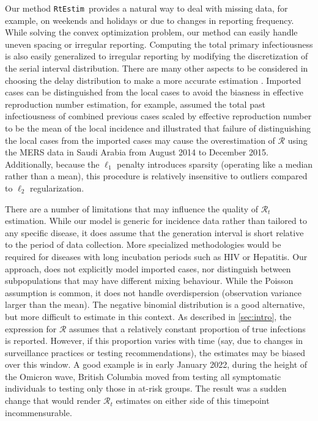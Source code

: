 \documentclass[10pt,letterpaper]{article}
\def\RtEstim{\texttt{RtEstim}}
\def\calR{\mathcal{R}}
\newcommand{\citep}[1]{\cite{#1}}
\begin{document}
Our method \RtEstim\ provides a natural way to deal with missing data, for
example, on weekends and holidays or due to changes in reporting frequency.
While solving the convex optimization problem, our method can easily 
handle uneven spacing or irregular reporting. Computing the total
primary infectiousness is also easily generalized to irregular reporting by
modifying the discretization of the serial interval distribution. There are many
other aspects to be considered in choosing the delay distribution to make a more accurate
estimation \citep{park2024estimating}. 
Imported cases can be distinguished from the local cases to avoid the biasness 
in effective reproduction number estimation, for example, \cite{thompson2019improved} 
assumed the total past infectiousness of combined previous cases scaled by effective 
reproduction number to be the mean of the local incidence and illustrated that 
failure of distinguishing the local cases from the imported cases may cause the overestimation 
of $\calR$ using the MERS data in Saudi Arabia from August 2014 to December 2015. 
Additionally, because the $\ell_1$ penalty introduces sparsity (operating like a median
rather than a mean), this procedure is relatively insensitive to outliers
compared to $\ell_2$ regularization.


There are a number of limitations that may influence the quality of
$\calR_t$ estimation. While our model is generic for incidence data 
rather than tailored to any specific disease, it does assume that the 
generation interval is short relative to the period of data collection. 
More specialized methodologies would be required for diseases with long 
incubation periods such as HIV or Hepatitis. 
Our approach, does not explicitly model imported cases, nor distinguish between
subpopulations that may have different mixing behaviour. 
While the Poisson assumption is common, it does not handle overdispersion
(observation variance larger than the mean). The negative binomial distribution
is a good alternative, but more difficult to estimate in this context.
As described in \autoref{sec:intro}, the expression for $\calR$ 
assumes that a relatively constant proportion of true infections is reported. 
However, if this proportion varies with time (say, due to changes in surveillance
practices or testing recommendations), the estimates may be biased over this
window. A good example is in early January 2022, during the height of the
Omicron wave, British Columbia moved from testing all symptomatic individuals to
testing only those in at-risk groups. The result was a sudden change that would
render $\calR_t$ estimates on either side of this timepoint incommensurable.
\end{document}
